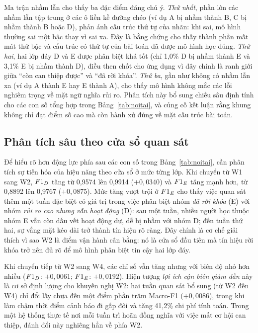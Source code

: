 Ma trận nhầm lẫn cho thấy ba đặc điểm đáng chú ý. \textit{Thứ nhất}, phần lớn các nhầm lẫn tập trung ở các ô liền kề đường chéo (ví dụ A bị nhầm thành B, C bị nhầm thành B hoặc D), phản ánh cấu trúc thứ tự của nhãn: khi sai, mô hình thường sai một bậc thay vì sai xa. Đây là bằng chứng cho thấy thành phần mất mát thứ bậc và cấu trúc có thứ tự của bài toán đã được mô hình học đúng. \textit{Thứ hai}, hai lớp đáy D và E được phân biệt khá tốt (chỉ 1,0\% D bị nhầm thành E và 3,1\% E bị nhầm thành D), điều then chốt cho ứng dụng vì đây chính là ranh giới giữa ``còn can thiệp được'' và ``đã rời khóa''. \textit{Thứ ba}, gần như không có nhầm lẫn xa (ví dụ A thành E hay E thành A), cho thấy mô hình không mắc các lỗi nghiêm trọng về mặt ngữ nghĩa rủi ro. Phân tích này bổ sung chiều sâu định tính cho các con số tổng hợp trong Bảng~\ref{tab:noitai}, và củng cố kết luận rằng khung không chỉ đạt điểm số cao mà còn hành xử đúng về mặt cấu trúc bài toán.

\subsection{Phân tích sâu theo cửa sổ quan sát}

Để hiểu rõ hơn động lực phía sau các con số trong Bảng~\ref{tab:noitai}, cần phân tích sự tiến hóa của hiệu năng theo cửa sổ ở mức từng lớp. Khi chuyển từ W1 sang W2, $F1_{D}$ tăng từ 0,9574 lên 0,9914 ($+0{,}0340$) và $F1_{E}$ tăng mạnh hơn, từ 0,8892 lên 0,9767 ($+0{,}0875$). Mức tăng vượt trội ở $F1_{E}$ cho thấy việc quan sát thêm một tuần đặc biệt có giá trị trong việc phân biệt nhóm \emph{đã rời khóa} (E) với nhóm \emph{rủi ro cao nhưng vẫn hoạt động} (D): sau một tuần, nhiều người học thuộc nhóm E vẫn còn dấu vết hoạt động dư, dễ bị nhầm với nhóm D; đến tuần thứ hai, sự vắng mặt kéo dài trở thành tín hiệu rõ ràng. Đây chính là cơ chế giải thích vì sao W2 là điểm vận hành cân bằng: nó là cửa sổ đầu tiên mà tín hiệu rời khóa trở nên đủ rõ để mô hình phân biệt tin cậy hai lớp đáy.

Khi chuyển tiếp từ W2 sang W4, các chỉ số vẫn tăng nhưng với biên độ nhỏ hơn nhiều ($F1_{D}$: $+0{,}0061$; $F1_{E}$: $+0{,}0192$). Hiện tượng \emph{lợi ích cận biên giảm dần} này là cơ sở định lượng cho khuyến nghị W2: hai tuần quan sát bổ sung (từ W2 đến W4) chỉ đổi lấy chưa đến một điểm phần trăm Macro-F1 ($+0{,}0086$), trong khi làm chậm thời điểm cảnh báo đi gấp đôi và tăng 41,2\% chi phí tính toán. Trong một hệ thống thực tế nơi mỗi tuần trì hoãn đồng nghĩa với việc mất cơ hội can thiệp, đánh đổi này nghiêng hẳn về phía W2.

